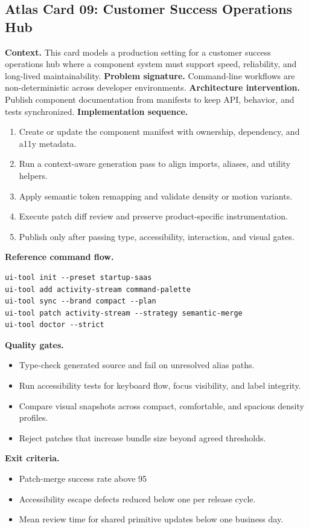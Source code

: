 \subsection*{Atlas Card 09: Customer Success Operations Hub}
\textbf{Context.} This card models a production setting for a customer success operations hub where a component system must support speed, reliability, and long-lived maintainability.
\textbf{Problem signature.} Command-line workflows are non-deterministic across developer environments.
\textbf{Architecture intervention.} Publish component documentation from manifests to keep API, behavior, and tests synchronized.
\textbf{Implementation sequence.}
\begin{enumerate}[leftmargin=*, itemsep=0.28em]
  \item Create or update the component manifest with ownership, dependency, and a11y metadata.
  \item Run a context-aware generation pass to align imports, aliases, and utility helpers.
  \item Apply semantic token remapping and validate density or motion variants.
  \item Execute patch diff review and preserve product-specific instrumentation.
  \item Publish only after passing type, accessibility, interaction, and visual gates.
\end{enumerate}
\textbf{Reference command flow.}
\begin{verbatim}
ui-tool init --preset startup-saas
ui-tool add activity-stream command-palette
ui-tool sync --brand compact --plan
ui-tool patch activity-stream --strategy semantic-merge
ui-tool doctor --strict
\end{verbatim}
\textbf{Quality gates.}
\begin{itemize}[leftmargin=*, itemsep=0.24em]
  \item Type-check generated source and fail on unresolved alias paths.
  \item Run accessibility tests for keyboard flow, focus visibility, and label integrity.
  \item Compare visual snapshots across compact, comfortable, and spacious density profiles.
  \item Reject patches that increase bundle size beyond agreed thresholds.
\end{itemize}
\textbf{Exit criteria.}
\begin{itemize}[leftmargin=*, itemsep=0.24em]
  \item Patch-merge success rate above 95%
  \item Accessibility escape defects reduced below one per release cycle.
  \item Mean review time for shared primitive updates below one business day.
\end{itemize}
\clearpage
